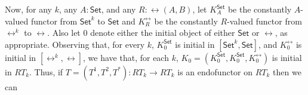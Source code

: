 \documentclass{lmcs}
\theoremstyle{plain}\newtheorem{satz}[thm]{Satz}
\newcommand{\cal}{\mathcal}
\newcommand{\set}{\mathsf{Set}}
\begin{document}
\begin{comment}
\begin{defi}\label{def:omega-cocont}
An endofunctor $T = (T^1,T^2,T^*)$ on $RT_k$ is {\em
$\omega$-cocontinuous} if $T^1$ and $T^2$ are $\omega$-cocontinuous
endofunctors on $[\set^k,\set]$ and $T^*$ is an $\omega$-cocontinuous
functor from $RT_k$ to $[\rel^k,\rel]$, i.e., is in
$[RT_k,[\rel^k,\rel]]$.
\end{defi}
\end{comment}
Now, for any $k$, any $A : \set$, and any $R : \rel(A, B)$, let
$K^\set_A$ be the constantly $A$-valued functor from $\set^k$ to
$\set$ and $K^\rel_R$ be the constantly $R$-valued functor from
$\rel^k$ to $\rel$.  Also let $0$ denote either the initial object of
either $\set$ or $\rel$, as appropriate.  Observing that, for every
$k$, $K^\set_0$ is initial in $[\set^k,\set]$, and $K^\rel_0$ is
initial in $[\rel^k,\rel]$, we have that, for each $k$, $K_0 =
(K^\set_0,K^\set_0,K^\rel_0)$ is initial in $RT_k$. Thus, if $T =
(T^1,T^2,T^*) : RT_k \to RT_k$ is an endofunctor on $RT_k$ then we can
\end{document}
